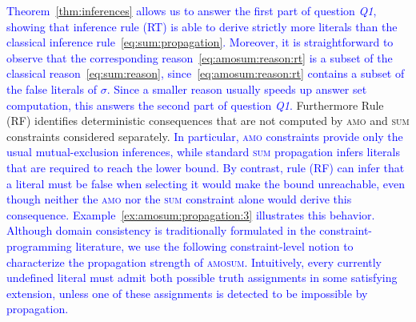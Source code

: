 \documentclass[preprint,authoryear]{elsarticle}
\theoremstyle{definition}
\begin{document}
\textcolor{blue}{Theorem~\ref{thm:inferences} allows us to answer the first part of question \emph{Q1}, showing that inference rule (RT) is able to derive strictly more literals than the classical inference rule~\eqref{eq:sum:propagation}.
Moreover, it is straightforward to observe that the corresponding reason~\eqref{eq:amosum:reason:rt} is a subset of the classical reason~\eqref{eq:sum:reason}, since~\eqref{eq:amosum:reason:rt} contains a subset of the false literals of $\sigma$. Since a smaller reason usually speeds up answer set computation, this answers the second part of question \emph{Q1}.}
Furthermore Rule (RF) identifies deterministic consequences that are not computed by \textsc{amo} and \textsc{sum} constraints considered separately. 
\textcolor{blue}{In particular, \textsc{amo} constraints provide only the usual mutual-exclusion inferences, while standard \textsc{sum} propagation infers literals that are required to reach the lower bound.
By contrast, rule (RF) can infer that a literal must be false when selecting it would make the bound unreachable, even though neither the \textsc{amo} nor the \textsc{sum} constraint alone would derive this consequence.
Example~\ref{ex:amosum:propagation:3} illustrates this behavior.
%
Although domain consistency is traditionally formulated in the constraint-programming literature, we use the following constraint-level notion to characterize the propagation strength of \textsc{amosum}.
Intuitively, every currently undefined literal must admit both possible truth assignments in some satisfying extension, unless one of these assignments is detected to be impossible by propagation.}
\end{document}
